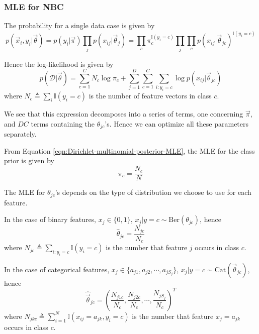 \subsubsection{MLE for NBC}
The probability for a single data case is given by
\begin{equation}
p(\vec{x}_i,y_i|\vec{\theta})=p(y_i|\vec{\pi})\prod\limits_j p(x_{ij}|\vec{\theta}_j)=\prod\limits_c \pi_c^{\mathbb{I}(y_i=c)} \prod\limits_j\prod\limits_c p(x_{ij}|\vec{\theta}_{jc})^{\mathbb{I}(y_i=c)}
\end{equation}

Hence the log-likelihood is given by
\begin{equation}
p(\mathcal{D}|\vec{\theta})=\sum\limits_{c=1}^C{N_c\log\pi_c}+ \sum\limits_{j=1}^D{\sum\limits_{c=1}^C{\sum\limits_{i:y_i=c}{\log p(x_{ij}|\vec{\theta}_{jc})}}}
\end{equation}
where $N_c \triangleq \sum\limits_i \mathbb{I}(y_i=c)$ is the number of feature vectors in class $c$.

We see that this expression decomposes into a series of terms, one concerning $\vec{\pi}$, and $DC$ terms containing the $\theta_{jc}$’s. Hence we can optimize all these parameters separately.

From Equation \eqref{eqn:Dirichlet-multinomial-posterior-MLE}, the MLE for the class prior is given by
\begin{equation}
\hat{\pi}_c=\dfrac{N_c}{N}
\end{equation}

The MLE for $\theta_{jc}$’s depends on the type of distribution we choose to use for each feature. 

In the case of binary features, $x_j \in \{0,1\}$, $x_j|y=c \sim \text{Ber}(\theta_{jc})$, hence
\begin{equation}
\hat{\theta}_{jc}=\dfrac{N_{jc}}{N_c}
\end{equation}
where $N_{jc} \triangleq \sum\limits_{i:y_i=c} \mathbb{I}(y_i=c)$ is the number that feature $j$ occurs in class $c$.

In the case of categorical features, $x_j \in \{a_{j1},a_{j2},\cdots, a_{jS_j}\}$, $x_j|y=c \sim \text{Cat}(\vec{\theta}_{jc})$, hence
\begin{equation}
\hat{\vec{\theta}}_{jc}=(\dfrac{N_{j1c}}{N_c},\dfrac{N_{j2c}}{N_c}, \cdots, \dfrac{N_{jS_j}}{N_c})^T
\end{equation}
where $N_{jkc} \triangleq \sum\limits_{i=1}^N \mathbb{I}(x_{ij}=a_{jk}, y_i=c)$ is the number that feature $x_j=a_{jk}$ occurs in class $c$.


